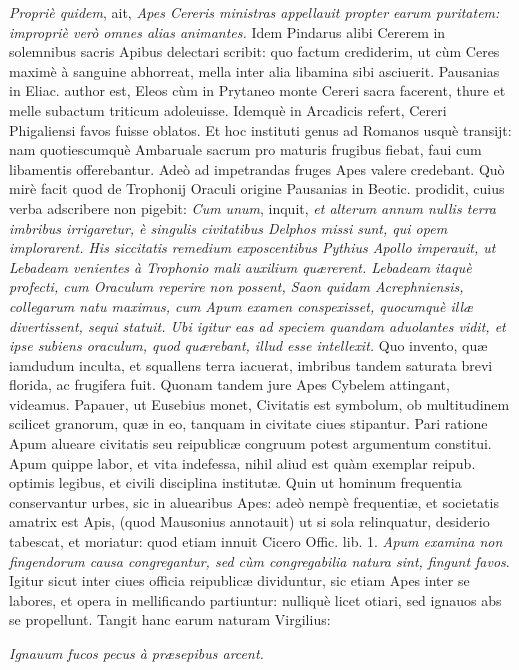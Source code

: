 \documentclass[a4paper, 11pt, oneside, polutonikogreek, latin]{article}
\begin{document}
\emph{Propriè quidem}, ait, \emph{Apes Cereris ministras appellauit propter earum puritatem: impropriè verò omnes alias animantes.} Idem Pindarus alibi Cererem in solemnibus sacris Apibus delectari scribit: quo factum crediderim, ut cùm Ceres maximè à sanguine abhorreat, mella inter alia libamina sibi asciuerit. Pausanias in Eliac. author est, Eleos cùm in Prytaneo monte Cereri sacra facerent, thure et melle subactum triticum adoleuisse. Idemquè in Arcadicis refert, Cereri Phigaliensi favos fuisse oblatos. Et hoc instituti genus ad Romanos usquè transijt: nam quotiescumquè Ambaruale sacrum pro maturis frugibus fiebat, faui cum libamentis offerebantur. Adeò ad impetrandas fruges Apes valere credebant. Quò mirè facit quod de Trophonij Oraculi origine Pausanias in Beotic. prodidit, cuius verba adscribere non pigebit: \emph{Cum unum}, inquit, \emph{et alterum annum nullis terra imbribus irrigaretur, è singulis civitatibus Delphos missi sunt, qui opem implorarent. His siccitatis remedium exposcentibus Pythius Apollo imperauit, ut Lebadeam venientes à Trophonio mali auxilium quærerent. Lebadeam itaquè profecti, cum Oraculum reperire non possent, Saon quidam Acrephniensis, collegarum natu maximus, cum Apum examen conspexisset, quocumquè illæ divertissent, sequi statuit. Ubi igitur eas ad speciem quandam aduolantes vidit, et ipse subiens oraculum, quod quærebant, illud esse intellexit.} Quo invento, quæ iamdudum inculta, et squallens terra iacuerat, imbribus tandem saturata brevi florida, ac frugifera fuit. Quonam tandem jure Apes Cybelem attingant, videamus. Papauer, ut Eusebius monet, Civitatis est symbolum, ob multitudinem scilicet granorum, quæ in eo, tanquam in civitate ciues stipantur. Pari ratione Apum alueare civitatis seu reipublicæ congruum potest argumentum constitui. Apum quippe labor, et vita indefessa, nihil aliud est quàm exemplar reipub. optimis legibus, et civili disciplina institutæ. Quin ut hominum frequentia conservantur urbes, sic in aluearibus Apes: adeò nempè frequentiæ, et societatis amatrix est Apis, (quod Mausonius annotauit) ut si sola relinquatur, desiderio tabescat, et moriatur: quod etiam innuit Cicero Offic. lib. 1. \emph{Apum examina non fingendorum causa congregantur, sed cùm congregabilia natura sint, fingunt favos}. Igitur sicut inter ciues officia reipublicæ dividuntur, sic etiam Apes inter se labores, et opera in mellificando partiuntur: nulliquè licet otiari, sed ignauos abs se propellunt. Tangit hanc earum naturam Virgilius:

\emph{Ignauum fucos pecus à præsepibus arcent.}
\end{document}
